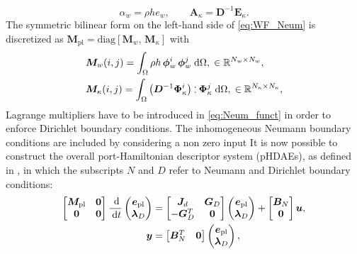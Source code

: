 \documentclass[letterpaper, 10 pt, conference]{ieeeconf}
\def\onedot{$\mathsurround0pt\ldotp$}
\def\cddot{%
	\mathbin{\vcenter{\baselineskip.67ex
			\hbox{\onedot}\hbox{\onedot}}%
}}
\begin{document}
\begin{equation}
\alpha_w = \rho h e_w, \qquad \bm{A}_{\kappa} = \bm{D}^{-1} \bm{E}_{\kappa}.
\end{equation}
The symmetric bilinear form on the left-hand side of \eqref{eq:WF_Neum} is discretized as $\bm{M}_{\text{pl}} = \text{diag}[\bm{M}_w,\, \bm{M}_\kappa]$ with
\begin{equation}
\begin{aligned}
&\bm{M}_w(i,j) = \int_{\Omega} \rho h \, \bm{\phi}_w^i \, \bm{\phi}_w^j \d\Omega, \; \in \mathbb{R}^{N_w \times N_w}, \\
&\bm{M}_\kappa(i,j) = \int_{\Omega}  \left( \bm{D}^{-1} \bm{\Phi}_\kappa^i \right) \cddot \bm{\Phi}_\kappa^j \d\Omega, \; \in \mathbb{R}^{N_\kappa \times N_\kappa},\\
\end{aligned}
\end{equation}
Lagrange multipliers have to be introduced in \eqref{eq:Neum_funct} in order to enforce Dirichlet boundary conditions. The inhomogeneous Neumann boundary conditions are included by considering a non zero input 
It is now possible to construct the overall port-Hamiltonian descriptor system (pHDAEs), as defined in \cite{beattie2018linear}, in which the subscripts $N$ and $D$ refer to Neumann and Dirichlet boundary conditions:
\begin{equation}
\begin{aligned}
\label{eq:discr_pl}
\begin{bmatrix}
\bm{M}_{\text{pl}} & \bm{0} \\
\bm{0} & \bm{0} \\
\end{bmatrix} \frac{\d}{\d t}
\begin{pmatrix}
\bm{e}_{\text{pl}}\\
\bm{\lambda}_D \\
\end{pmatrix}
&= \begin{bmatrix}
\bm{J}_d & \bm{G}_D\\
-\bm{G}_D^T & \bm{0} \\
\end{bmatrix}
\begin{pmatrix}
\bm{e}_{\text{pl}}\\
\bm{\lambda}_D \\
\end{pmatrix} + \begin{bmatrix}
\bm{B}_N\\
\bm{0} \\
\end{bmatrix}
\bm{u}, \\
\bm{y} &= \begin{bmatrix}
\bm{B}_N^T & \bm{0} \\ \end{bmatrix}
\begin{pmatrix}
\bm{e}_{\text{pl}}\\
\bm{\lambda}_D \\
\end{pmatrix},
\end{aligned}
\end{equation}
\end{document}
